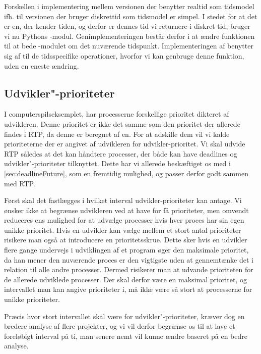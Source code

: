 Forskellen i implementering mellem versionen der benytter realtid som tidsmodel ifh. til versionen der bruger diskrettid som tidsmodel er simpel. I stedet for at det er \sched en, der kender tiden, og derfor er dennes tid vi returnere i diskret tid, bruger vi nu Pythons -modul. Genimplementeringen består derfor  i at ændre funktionen  til at bede -modulet om det nuværende tidspunkt. Implementeringen af  benytter sig af  til de tidsspecifike operationer, hvorfor vi kan genbruge denne funktion, uden en eneste ændring. 

\subsection{Udvikler"-prioriteter}
I computerspilseksemplet, har processerne forskellige prioritet dikteret af udvikleren. Denne prioritet er ikke det samme som den prioritet der allerede findes i RTP, da denne  er beregnet af \sched en. For at adskille dem vil vi kalde prioriteterne der er angivet af udvikleren for udvikler-prioritet. Vi skal udvide RTP således at det kan håndtere processer, der både kan have deadlines og udvikler"-prioriteter tilknyttet. Dette har vi allerede beskæftiget os med i \cref{sec:deadlineFuture}, som en fremtidig mulighed, og passer derfor godt sammen med RTP.

Først skal det fastlægges i hvilket interval udvikler-prioriteter kan antage. Vi ønsker ikke at begrænse udvikleren ved at have for få prioriteter, men omvendt reduceres \sched ens  mulighed for at udvælge processer hvis hver proces har sin egen unikke prioritet. Hvis en udvikler kan vælge mellem et stort antal prioriteter risikere man også at introducere en prioritetsskrue. Dette sker hvis en udvikler flere gange undervejs i udviklingen af et program øger den maksimale prioritet, da han mener den nuværende proces er den vigtigste uden at gennemtænke det i relation til alle andre processer. Dermed risikerer man at udvande prioriteten for de allerede udviklede processer.  Der skal derfor være en maksimal prioritet, og intervallet man kan angive prioriteter i, må ikke være så stort at processerne for unikke prioriteter.

Præcis  hvor stort intervallet skal være for udvikler"-prioriteter, kræver dog en bredere analyse af flere projekter, og vi vil derfor begrænse os til at lave et foreløbigt interval på ti, man senere nemt vil kunne ændre baseret på en bedre analyse.



